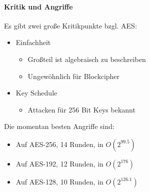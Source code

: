 \paragraph{Kritik und Angriffe}

Es gibt zwei große Kritikpunkte bzgl. AES: 

\begin{itemize}
    \item Einfachheit
    \begin{itemize}
        \item Großteil ist algebraisch zu beschreiben
        \item Ungewöhnlich für Blockcipher
    \end{itemize}
    \item Key Schedule 
    \begin{itemize}
        \item Attacken für 256 Bit Keys bekannt
    \end{itemize}
\end{itemize}

Die momentan besten Angriffe sind:

\begin{itemize}
    \item Auf AES-256, 14 Runden, in $O(2^{99.5})$
    \item Auf AES-192, 12 Runden, in $O(2^{176})$
    \item Auf AES-128, 10 Runden, in $O(2^{126.1})$
\end{itemize}



